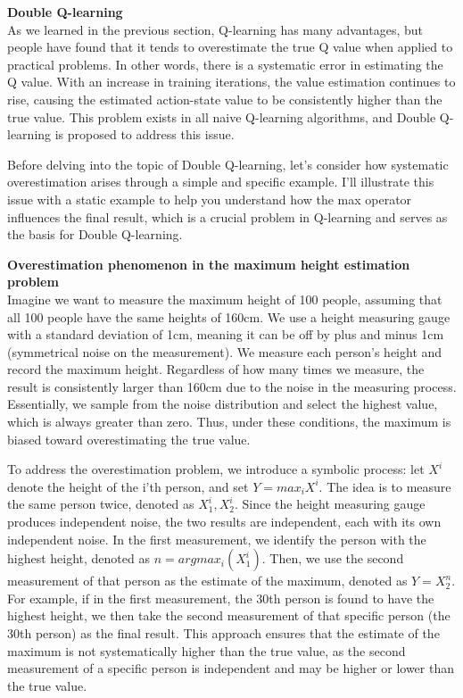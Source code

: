 \documentclass{article}
\begin{document}
\noindent
    \textbf{Double Q-learning}\\
    \noindent
As we learned in the previous section, Q-learning has many advantages, but people have found that it tends to overestimate the true Q value when applied to practical problems. In other words, there is a systematic error in estimating the Q value. With an increase in training iterations, the value estimation continues to rise, causing the estimated action-state value to be consistently higher than the true value. This problem exists in all naive Q-learning algorithms, and Double Q-learning is proposed to address this issue.

Before delving into the topic of Double Q-learning, let's consider how systematic overestimation arises through a simple and specific example. I'll illustrate this issue with a static example to help you understand how the max operator influences the final result, which is a crucial problem in Q-learning and serves as the basis for Double Q-learning.

\hspace*{\fill}

\begin{mdframed}[hidealllines=true,backgroundcolor=gray!20]
\textbf{Overestimation phenomenon in the maximum height estimation problem } \\
Imagine we want to measure the maximum height of 100 people, assuming that all 100 people have the same heights of 160cm. We use a height measuring gauge with a standard deviation of 1cm, meaning it can be off by plus and minus 1cm (symmetrical noise on the measurement). We measure each person's height and record the maximum height. Regardless of how many times we measure, the result is consistently larger than 160cm due to the noise in the measuring process. Essentially, we sample from the noise distribution and select the highest value, which is always greater than zero. Thus, under these conditions, the maximum is biased toward overestimating the true value.
\end{mdframed}

\hspace*{\fill}

To address the overestimation problem, we introduce a symbolic process: let $X^i$ denote the height of the i'th person, and set $ Y = max_{i}X^i$. The idea is to measure the same person twice, denoted as $X_1^i, X_2^i$. Since the height measuring gauge produces independent noise, the two results are independent, each with its own independent noise. In the first measurement, we identify the person with the highest height, denoted as $n = argmax_{i}(X_1^i)$. Then, we use the second measurement of that person as the estimate of the maximum, denoted as $Y = X^n_2$. For example, if in the first measurement, the 30th person is found to have the highest height, we then take the second measurement of that specific person (the 30th person) as the final result. This approach ensures that the estimate of the maximum is not systematically higher than the true value, as the second measurement of a specific person is independent and may be higher or lower than the true value.
\end{document}
